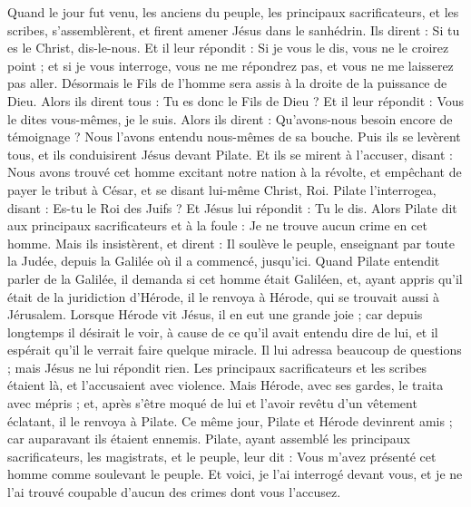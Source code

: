 \begin{multicols}{2}
Quand le jour fut venu, les anciens du peuple, les principaux sacrificateurs, et les scribes, s'assemblèrent, et firent amener Jésus dans le sanhédrin.
Ils dirent : Si tu es le Christ, dis-le-nous. Et il leur répondit : Si je vous le dis, vous ne le croirez point ;
et si je vous interroge, vous ne me répondrez pas, et vous ne me laisserez pas aller.
Désormais le Fils de l'homme sera assis à la droite de la puissance de Dieu.
Alors ils dirent tous : Tu es donc le Fils de Dieu ? Et il leur répondit : Vous le dites vous-mêmes, je le suis.
Alors ils dirent : Qu'avons-nous besoin encore de témoignage ? Nous l'avons entendu nous-mêmes de sa bouche.
\VerseOne{}Puis ils se levèrent tous, et ils conduisirent Jésus devant Pilate.
Et ils se mirent à l'accuser, disant : Nous avons trouvé cet homme excitant notre nation à la révolte, et empêchant de payer le tribut à César, et se disant lui-même Christ, Roi.
Pilate l'interrogea, disant : Es-tu le Roi des Juifs ? Et Jésus lui répondit : Tu le dis.
Alors Pilate dit aux principaux sacrificateurs et à la foule : Je ne trouve aucun crime en cet homme.
Mais ils insistèrent, et dirent : Il soulève le peuple, enseignant par toute la Judée, depuis la Galilée où il a commencé, jusqu'ici.
Quand Pilate entendit parler de la Galilée, il demanda si cet homme était Galiléen,
et, ayant appris qu'il était de la juridiction d'Hérode, il le renvoya à Hérode, qui se trouvait aussi à Jérusalem.
Lorsque Hérode vit Jésus, il en eut une grande joie ; car depuis longtemps il désirait le voir, à cause de ce qu'il avait entendu dire de lui, et il espérait qu'il le verrait faire quelque miracle.
Il lui adressa beaucoup de questions ; mais Jésus ne lui répondit rien.
Les principaux sacrificateurs et les scribes étaient là, et l'accusaient avec violence.
Mais Hérode, avec ses gardes, le traita avec mépris ; et, après s'être moqué de lui et l'avoir revêtu d'un vêtement éclatant, il le renvoya à Pilate.
Ce même jour, Pilate et Hérode devinrent amis ; car auparavant ils étaient ennemis.
Pilate, ayant assemblé les principaux sacrificateurs, les magistrats, et le peuple, leur dit :
Vous m'avez présenté cet homme comme soulevant le peuple. Et voici, je l'ai interrogé devant vous, et je ne l'ai trouvé coupable d'aucun des crimes dont vous l'accusez.

\end{multicols}
